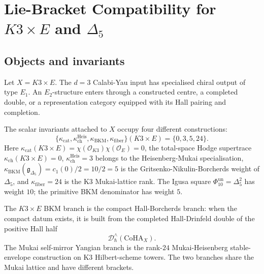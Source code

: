 \providecommand{\kBKM}{\kappa_{\mathrm{BKM}}}
\providecommand{\kch}{\kappa_{\mathrm{ch}}}
\providecommand{\kcat}{\kappa_{\mathrm{cat}}}
\providecommand{\kfib}{\kappa_{\mathrm{fiber}}}
\providecommand{\gBPS}{\mathfrak{g}_{\mathrm{BPS}}}
\providecommand{\gDel}{\mathfrak{g}_{\Delta_5}}
\providecommand{\fn}{\mathfrak{n}}
\providecommand{\LamII}{\Lambda^{2,1}_{II}}
\providecommand{\CoHA}{\mathrm{CoHA}}
\providecommand{\DT}{\mathrm{DT}}
\providecommand{\Ext}{\mathrm{Ext}}
\providecommand{\Pfilt}{{}^{\mathfrak p}\!\tau}
\providecommand{\Hall}{\mathcal H}
\providecommand{\Mmod}{\mathcal M}
\providecommand{\BPS}{\mathcal{BPS}}
\providecommand{\piII}{\pi_{\mathrm{II}}}
\providecommand{\epsII}{\varepsilon_{\LamII}}
\providecommand{\BRST}{\mathrm{BRST}}

\section*{Lie-Bracket Compatibility for \texorpdfstring{$K3\times E$}{K3 x E}
and \texorpdfstring{$\Delta_5$}{Delta5}}

\subsection*{Objects and invariants}

Let \(X=K3\times E\).  The \(d=3\) Calabi-Yau input has specialised
chiral output of type \(E_1\).  An \(E_2\)-structure enters through a
constructed centre, a completed double, or a representation category
equipped with its Hall pairing and completion.

The scalar invariants attached to \(X\) occupy four different
constructions:
\[
  \{\kcat,\kch^{\mathrm{Heis}},\kBKM,\kfib\}(K3\times E)
  =
  \{0,3,5,24\}.
\]
Here \(\kcat(K3\times E)=\chi(\mathcal O_{K3})\chi(\mathcal O_E)=0\),
the total-space Hodge supertrace \(\kch(K3\times E)=0\),
\(\kch^{\mathrm{Heis}}=3\) belongs to the Heisenberg-Mukai
specialisation, \(\kBKM(\gDel)=c_1(0)/2=10/2=5\) is the
Gritsenko-Nikulin-Borcherds weight of \(\Delta_5\), and
\(\kfib=24\) is the K3 Mukai-lattice rank.  The Igusa square
\(\Phi_{10}^{\mathrm{un}}=\Delta_5^2\) has weight \(10\); the
primitive BKM denominator has weight \(5\).

The \(K3\times E\) BKM branch is the compact Hall-Borcherds branch:
when the compact datum exists, it is built from the completed
Hall-Drinfeld double of the positive Hall half
\[
  \mathcal D^\wedge_\hbar(\CoHA_X).
\]
The Mukai self-mirror Yangian branch is the rank-\(24\)
Mukai-Heisenberg stable-envelope construction on K3 Hilbert-scheme
towers.  The two branches share the Mukai lattice and have different
brackets.

